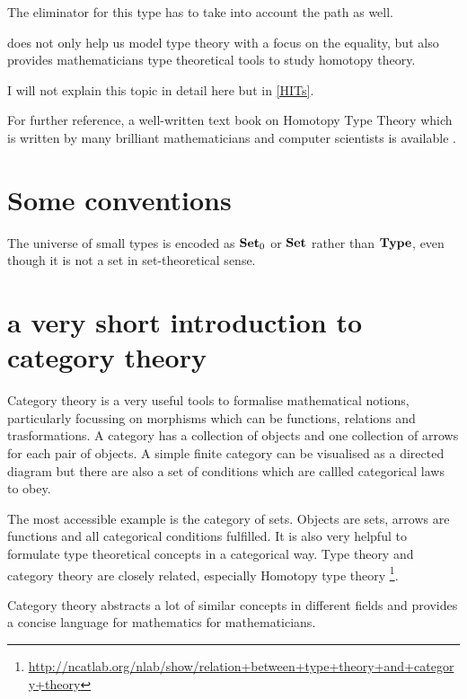 The eliminator for this type has to take into account the path as well.

\hott does not only help us model type theory with a focus on the equality, but also provides mathematicians type theoretical tools to study homotopy theory.




I will not explain this topic in detail here but in \autoref{HITs}.


For further reference, a well-written text book on Homotopy Type Theory which is written by many brilliant mathematicians and computer
scientists is available \cite{hott}. 



\section{Some conventions}


The universe of small types is encoded as $\operatorname{\mathbf{Set}}_{0}$ or $\operatorname{\mathbf{Set}}$ rather than $\operatorname{\mathbf{Type}}$, even though it is not a set in set-theoretical sense.



\section{a very short introduction to category theory}

Category theory is a very useful tools to formalise mathematical notions, particularly focussing on morphisms which can be functions, relations and trasformations.
A category has a collection of objects and one collection of arrows for each pair of objects. A simple finite category can be visualised as a directed diagram but there are also a set of conditions which are callled categorical laws to obey. 

The most accessible example is the category of sets. Objects are sets, arrows are functions and all categorical conditions fulfilled. It is also very helpful to formulate type theoretical concepts in a categorical way. Type theory and category theory are closely related, especially Homotopy type theory \footnote{\url{http://ncatlab.org/nlab/show/relation+between+type+theory+and+category+theory}}.

Category theory abstracts a lot of similar concepts in different fields and provides a concise language for mathematics for mathematicians.


